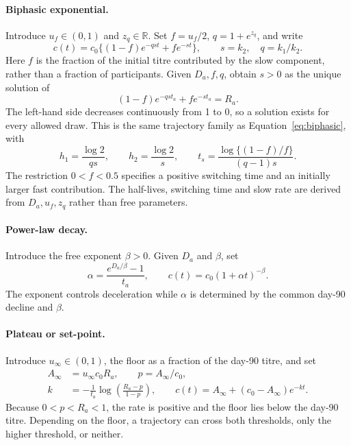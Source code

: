 \documentclass[11pt,a4paper]{article}
\begin{document}
\paragraph{Biphasic exponential.}
Introduce $u_f\in(0,1)$ and $z_q\in\mathbb{R}$. Set $f=u_f/2$,
$q=1+e^{z_q}$, and write
\begin{equation}
  c(t)=c_0\{(1-f)e^{-qst}+fe^{-st}\},\qquad s=k_2,\quad q=k_1/k_2.
  \label{eq:prior-biphasic}
\end{equation}
Here $f$ is the fraction of the initial titre contributed by the slow
component, rather than a fraction of participants. Given $D_a,f,q$, obtain
$s>0$ as the unique solution of
\begin{equation}
  (1-f)e^{-qst_a}+fe^{-st_a}=R_a.
  \label{eq:prior-biphasic-root}
\end{equation}
The left-hand side decreases continuously from 1 to 0, so a solution exists
for every allowed draw. This is the same trajectory family as
Equation~\ref{eq:biphasic}, with
\begin{equation}
  h_1=\frac{\log 2}{qs},\qquad h_2=\frac{\log 2}{s},\qquad
  t_s=\frac{\log\{(1-f)/f\}}{(q-1)s}.
  \label{eq:prior-biphasic-map}
\end{equation}
The restriction $0<f<0.5$ specifies a positive switching time and an
initially larger fast contribution. The half-lives, switching time and
slow rate are derived from $D_a,u_f,z_q$ rather than free parameters.

\paragraph{Power-law decay.}
Introduce the free exponent $\beta>0$. Given $D_a$ and $\beta$, set
\begin{equation}
  \alpha=\frac{e^{D_a/\beta}-1}{t_a},\qquad
  c(t)=c_0(1+\alpha t)^{-\beta}.
  \label{eq:prior-powerlaw}
\end{equation}
The exponent controls deceleration while $\alpha$ is determined by the
common day-90 decline and $\beta$.

\paragraph{Plateau or set-point.}
Introduce $u_\infty\in(0,1)$, the floor as a fraction of the day-90 titre,
and set
\begin{align}
  A_\infty&=u_\infty c_0R_a,\qquad p=A_\infty/c_0, \\
  k&=-\frac{1}{t_a}\log\!\left(\frac{R_a-p}{1-p}\right),\qquad
  c(t)=A_\infty+(c_0-A_\infty)e^{-kt}.
  \label{eq:prior-plateau}
\end{align}
Because $0<p<R_a<1$, the rate is positive and the floor lies below the
day-90 titre. Depending on the floor, a trajectory can cross both
thresholds, only the higher threshold, or neither.
\end{document}
